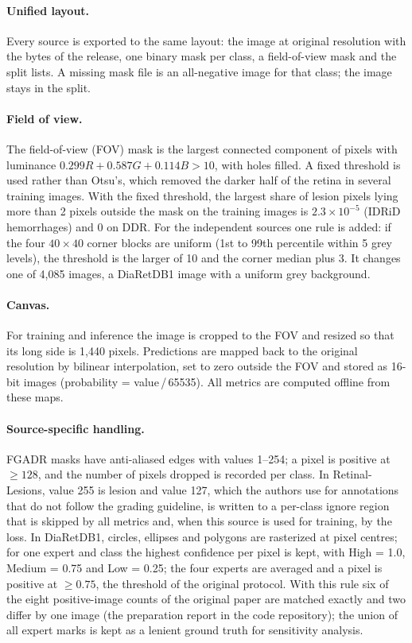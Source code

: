 \paragraph{Unified layout.} Every source is exported to the same layout: the image at original resolution with the bytes of the release, one binary mask per class, a field-of-view mask and the split lists. A missing mask file is an all-negative image for that class; the image stays in the split.

\paragraph{Field of view.} The field-of-view (FOV) mask is the largest connected component of pixels with luminance $0.299R+0.587G+0.114B>10$, with holes filled. A fixed threshold is used rather than Otsu's, which removed the darker half of the retina in several training images. With the fixed threshold, the largest share of lesion pixels lying more than 2 pixels outside the mask on the training images is $2.3\times10^{-5}$ (IDRiD hemorrhages) and 0 on DDR. For the independent sources one rule is added: if the four $40\times40$ corner blocks are uniform (1st to 99th percentile within 5 grey levels), the threshold is the larger of 10 and the corner median plus 3. It changes one of 4,085 images, a DiaRetDB1 image with a uniform grey background.

\paragraph{Canvas.} For training and inference the image is cropped to the FOV and resized so that its long side is 1,440 pixels. Predictions are mapped back to the original resolution by bilinear interpolation, set to zero outside the FOV and stored as 16-bit images (probability = value\,/\,65535). All metrics are computed offline from these maps.

\paragraph{Source-specific handling.} FGADR masks have anti-aliased edges with values 1--254; a pixel is positive at $\geq128$, and the number of pixels dropped is recorded per class. In Retinal-Lesions, value 255 is lesion and value 127, which the authors use for annotations that do not follow the grading guideline, is written to a per-class ignore region that is skipped by all metrics and, when this source is used for training, by the loss. In DiaRetDB1, circles, ellipses and polygons are rasterized at pixel centres; for one expert and class the highest confidence per pixel is kept, with High = 1.0, Medium = 0.75 and Low = 0.25; the four experts are averaged and a pixel is positive at $\geq0.75$, the threshold of the original protocol. With this rule six of the eight positive-image counts of the original paper are matched exactly and two differ by one image (the preparation report in the code repository); the union of all expert marks is kept as a lenient ground truth for sensitivity analysis.

